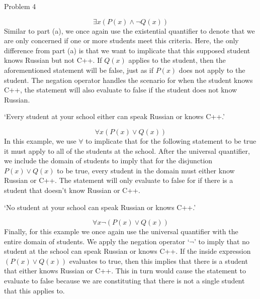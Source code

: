 \begin{problem}{Problem 4}
\begin{Highlight}
        \begin{equation}
            \exists x (P(x) \wedge \neg Q(x))
        \end{equation}
        Similar to part (a), we once again use the existential quantifier to denote that we are only concerned if one or more students meet this criteria. Here, the only difference from part (a) is that we want 
        to implicate that this supposed student knows Russian but not C++. If $Q(x)$ applies to the student, then the aforementioned statement will be false, just as if $P(x)$ does not apply to the student. The 
        negation operator handles the scenario for when the student knows C++, the statement will also evaluate to false if the student does not know Russian.
    \end{Highlight}

    \begin{Highlight}
        `Every student at your school either can speak Russian or knows C++.'

        \begin{equation}
            \forall x (P(x) \vee Q(x))
        \end{equation}
        In this example, we use $\forall$ to implicate that for the following statement to be true it must apply to all of the students at the school. After the universal quantifier, we include the domain of
        students to imply that for the disjunction $P(x) \vee Q(x)$ to be true, every student in the domain must either know Russian or C++. The statement will only evaluate to false for if there is a student
        that doesn't know Russian or C++.
    \end{Highlight}

    \begin{Highlight}
        `No student at your school can speak Russian or knows C++.'

        \begin{equation}
            \forall x \neg(P(x) \vee Q(x))
        \end{equation}
        Finally, for this example we once again use the universal quantifier with the entire domain of students. We apply the negation operator `$\neg$' to imply that no student at the school can speak Russian
        or knows C++. If the inside expression $(P(x) \vee Q(x))$ evaluates to true, then this implies that there is a student that either knows Russian or C++. This in turn would cause the statement to evaluate
        to false because we are constituting that there is not a single student that this applies to.
    \end{Highlight}
\end{problem}


